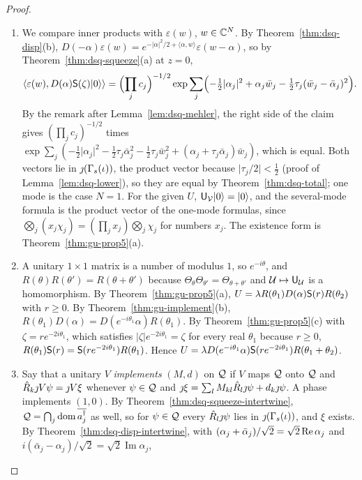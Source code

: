 \begin{veteenv}
\begin{proof}
\begin{enumerate}
\item[(a)] We compare inner products with $\varepsilon(w)$, $w\in\mathbb C^N$. By Theorem~\ref{thm:dsq-disp}(b),
$D(-\alpha)\varepsilon(w)=e^{-\lvert\alpha\rvert^2/2+\langle\alpha,w\rangle}\varepsilon(w-\alpha)$, so by Theorem~\ref{thm:dsq-squeeze}(a) at $z=0$,
\[
 \langle\varepsilon(w),D(\alpha)\mathsf S(\zeta)\lvert 0\rangle\rangle=\Bigl(\prod_jc_j\Bigr)^{-1/2}
 \exp\sum_j\Bigl(-\tfrac12\lvert\alpha_j\rvert^2+\alpha_j\bar w_j-\tfrac12\tau_j(\bar w_j-\bar\alpha_j)^2\Bigr).
\]
By the remark after Lemma~\ref{lem:dsq-mehler}, the right side of the claim gives $(\prod_jc_j)^{-1/2}$ times
$\exp\sum_j(-\tfrac12\lvert\alpha_j\rvert^2-\tfrac12\tau_j\bar\alpha_j^2-\tfrac12\tau_j\bar w_j^2+(\alpha_j+\tau_j\bar\alpha_j)\bar w_j)$, which is
equal. Both vectors lie in
$\jmath(\Gamma_s(\iota))$, the product vector because $\lvert\tau_j/2\rvert<\frac12$ (proof of Lemma~\ref{lem:dsq-lower}), so they are equal by
Theorem~\ref{thm:dsq-total}; one mode is the case $N=1$. For the given $U$, $\mathsf U_\mathcal V\lvert 0\rangle=\lvert 0\rangle$, and the several-mode formula is the
product vector of the one-mode formulas, since $\bigotimes_j(x_j\chi_j)=(\prod_jx_j)\bigotimes_j\chi_j$ for numbers $x_j$. The existence form is
Theorem~\ref{thm:gu-prop5}(a).
\item[(b)] A unitary $1\times1$ matrix is a number of modulus $1$, so $e^{-i\theta}$, and $R(\theta)R(\theta')=R(\theta+\theta')$ because
$\Theta_\theta\Theta_{\theta'}=\Theta_{\theta+\theta'}$ and $\mathcal U\mapsto\mathsf U_\mathcal U$ is a homomorphism. By Theorem~\ref{thm:gu-prop5}(a),
$U=\lambda R(\theta_1)D(\alpha)\mathsf S(r)R(\theta_2)$ with $r\ge0$. By Theorem~\ref{thm:gu-implement}(b), $R(\theta_1)D(\alpha)=D(e^{-i\theta_1}\alpha)R(\theta_1)$.
By Theorem~\ref{thm:gu-prop5}(c) with $\zeta=re^{-2i\theta_1}$, which satisfies $\lvert\zeta\rvert e^{-2i\theta_1}=\zeta$ for every real $\theta_1$
because $r\ge0$, $R(\theta_1)\mathsf S(r)=\mathsf S(re^{-2i\theta_1})R(\theta_1)$. Hence $U=\lambda D(e^{-i\theta_1}\alpha)\mathsf S(re^{-2i\theta_1})R(\theta_1+\theta_2)$.
\item[(c)] Say that a unitary $V$ \emph{implements} $(M,d)$ on $\mathcal Q$ if $V$ maps $\mathcal Q$ onto $\mathcal Q$ and $\hat R_k\jmath V\psi=\jmath V\xi$ whenever
$\psi\in\mathcal Q$ and $\jmath\xi=\sum_lM_{kl}\hat R_l\jmath\psi+d_k\jmath\psi$. A phase implements $(1,0)$. By Theorem~\ref{thm:dsq-squeeze-intertwine},
$\mathcal Q=\bigcap_j\operatorname{dom}\overline{a_j^\dagger}$ as well, so for $\psi\in\mathcal Q$ every $\hat R_l\jmath\psi$ lies in $\jmath(\Gamma_s(\iota))$, and $\xi$ exists. By
Theorem~\ref{thm:dsq-disp-intertwine}, with $(\alpha_j+\bar\alpha_j)/\sqrt2=\sqrt2\operatorname{Re}\alpha_j$ and $i(\bar\alpha_j-\alpha_j)/\sqrt2=\sqrt2\operatorname{Im}\alpha_j$,

\end{enumerate}
\end{proof}
\end{veteenv}
